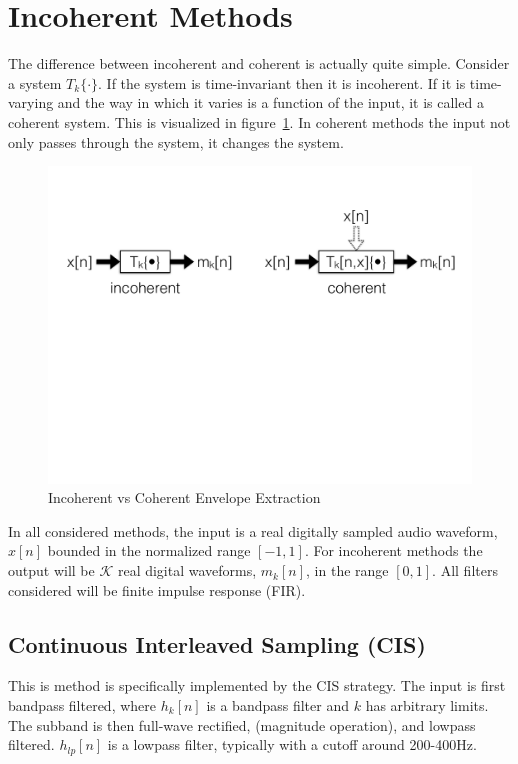 \documentclass [11pt, proquest,oneside] {ganter_thesis}[2015/03/03]
\begin{document}
\section{Incoherent Methods}

The difference between incoherent and coherent is actually quite simple.  Consider a system $T_k\{\cdot\}$.  If the system is time-invariant then it is incoherent.  If it is time-varying and the way in which it varies is a function of the input, it is called a coherent system.  This is visualized in figure~\ref{fig:incoherent_vs_coherent}.  In coherent methods the input not only passes through the system, it changes the system.

\begin{figure}[!ht]
  \centering
    \includegraphics[width=1\textwidth]{incoherent_vs_coherent}   
    \caption{Incoherent vs Coherent Envelope Extraction}\label{fig:incoherent_vs_coherent}
\end{figure}

In all considered methods, the input is a real digitally sampled audio waveform, $x[n]$ bounded in the normalized range $[-1, 1]$.  For incoherent methods the output will be $\mathcal{K}$ real digital waveforms, $m_k[n]$, in the range $[0, 1]$.  All filters considered will be finite impulse response (FIR).

\subsection{Continuous Interleaved Sampling (CIS)}

This is method is specifically implemented by the CIS strategy.  The input is first bandpass filtered, where $h_k[n]$ is a bandpass filter and $k$ has arbitrary limits.  The subband is then full-wave rectified, (magnitude operation), and lowpass filtered.  $h_{lp}[n]$ is a lowpass filter, typically with a cutoff around 200-400Hz.
\end{document}
